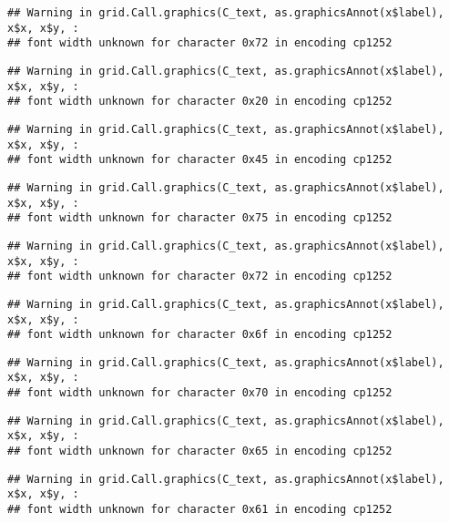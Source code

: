 \documentclass[
]{article}
\begin{document}
\begin{verbatim}
## Warning in grid.Call.graphics(C_text, as.graphicsAnnot(x$label), x$x, x$y, :
## font width unknown for character 0x72 in encoding cp1252
\end{verbatim}

\begin{verbatim}
## Warning in grid.Call.graphics(C_text, as.graphicsAnnot(x$label), x$x, x$y, :
## font width unknown for character 0x20 in encoding cp1252
\end{verbatim}

\begin{verbatim}
## Warning in grid.Call.graphics(C_text, as.graphicsAnnot(x$label), x$x, x$y, :
## font width unknown for character 0x45 in encoding cp1252
\end{verbatim}

\begin{verbatim}
## Warning in grid.Call.graphics(C_text, as.graphicsAnnot(x$label), x$x, x$y, :
## font width unknown for character 0x75 in encoding cp1252
\end{verbatim}

\begin{verbatim}
## Warning in grid.Call.graphics(C_text, as.graphicsAnnot(x$label), x$x, x$y, :
## font width unknown for character 0x72 in encoding cp1252
\end{verbatim}

\begin{verbatim}
## Warning in grid.Call.graphics(C_text, as.graphicsAnnot(x$label), x$x, x$y, :
## font width unknown for character 0x6f in encoding cp1252
\end{verbatim}

\begin{verbatim}
## Warning in grid.Call.graphics(C_text, as.graphicsAnnot(x$label), x$x, x$y, :
## font width unknown for character 0x70 in encoding cp1252
\end{verbatim}

\begin{verbatim}
## Warning in grid.Call.graphics(C_text, as.graphicsAnnot(x$label), x$x, x$y, :
## font width unknown for character 0x65 in encoding cp1252
\end{verbatim}

\begin{verbatim}
## Warning in grid.Call.graphics(C_text, as.graphicsAnnot(x$label), x$x, x$y, :
## font width unknown for character 0x61 in encoding cp1252
\end{verbatim}
\end{document}
